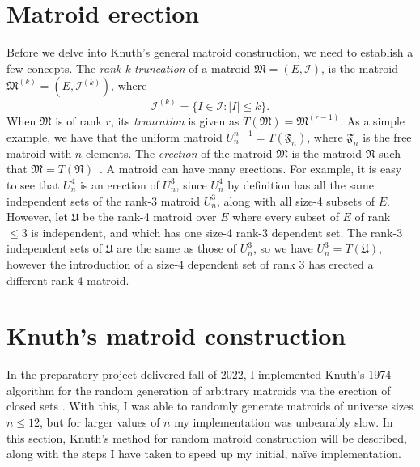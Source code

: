 \section{Matroid erection}
Before we delve into Knuth's general matroid construction, we need to establish a few concepts. The \textit{rank-k truncation} of a matroid $\mathfrak{M} = (E, \mathcal{I})$, is the matroid $\mathfrak{M}^{(k)} = (E, \mathcal{I}^{(k)})$, where
$$\mathcal{I}^{(k)} = \{ I \in \mathcal{I} : |I| \leq k \}.$$
When $\mathfrak{M}$ is of rank $r$, its \textit{truncation} is given as $T(\mathfrak{M}) = \mathfrak{M}^{(r-1)}$. As a simple example, we have that the uniform matroid $U_n^{n-1} = T(\mathfrak{F}_n)$, where $\mathfrak{F}_n$ is the free matroid with $n$ elements. The \textit{erection} of the matroid $\mathfrak{M}$ is the matroid $\mathfrak{N}$ such that $\mathfrak{M} = T(\mathfrak{N})$~\cite{Crapo1970}. A matroid can have many erections. For example, it is easy to see that $U_n^4$ is an erection of $U_n^3$, since $U_n^4$ by definition has all the same independent sets of the rank-3 matroid $U_n^3$, along with all size-4 subsets of $E$. However, let $\mathfrak{U}$ be the rank-4 matroid over $E$ where every subset of $E$ of rank $\leq 3$ is independent, and which has one size-4 rank-3 dependent set. The rank-3 independent sets of $\mathfrak{U}$ are the same as those of $U_n^3$, so we have $U_n^3 = T({\mathfrak{U}})$, however the introduction of a size-4 dependent set of rank 3 has erected a different rank-4 matroid.


\section{Knuth's matroid construction}
In the preparatory project delivered fall of 2022, I implemented Knuth's 1974 algorithm for the random generation of arbitrary matroids via the erection of closed sets \cite{knuth-1975}. With this, I was able to randomly generate matroids of universe sizes $n \leq 12$, but for larger values of $n$ my implementation was unbearably slow. In this section, Knuth's method for random matroid construction will be described, along with the steps I have taken to speed up my initial, naïve implementation.

